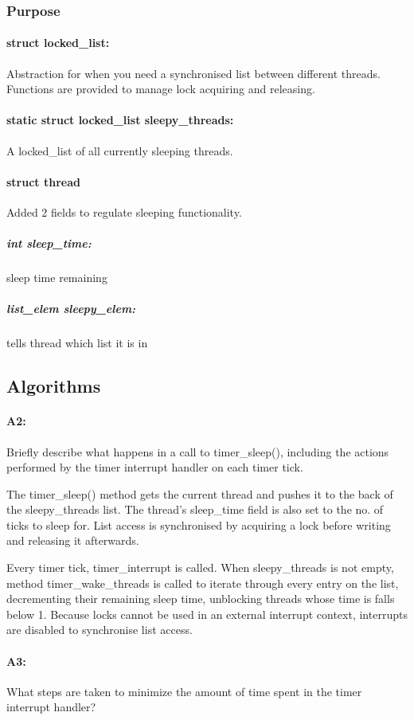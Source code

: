 \documentclass[11pt]{article}
\begin{document}
\subsubsection{Purpose}
\paragraph{struct locked\_list: }
Abstraction for when you need a synchronised list between different threads. Functions are provided to manage lock acquiring and releasing.

\paragraph{static struct locked\_list sleepy\_threads: }
A locked\_list of all currently sleeping threads.

\paragraph{struct thread}
  Added 2 fields to regulate sleeping functionality.

\subparagraph{int sleep\_time:} sleep time remaining
\subparagraph{list\_elem sleepy\_elem:} tells thread which list it is in

\subsection{Algorithms}
\paragraph{A2:} Briefly describe what happens in a call to timer\_sleep(), including the actions performed by the timer interrupt handler on each timer tick.

The timer\_sleep() method gets the current thread and pushes it to the back of the sleepy\_threads list. The thread's sleep\_time field is also set to the no. of ticks to sleep for. List access is synchronised by acquiring a lock before writing and releasing it afterwards.

Every timer tick, timer\_interrupt is called. When sleepy\_threads is not empty, method timer\_wake\_threads is called to iterate through every entry on the list, decrementing their remaining sleep time, unblocking threads whose time is falls below 1. Because locks cannot be used in an external interrupt context, interrupts are disabled to synchronise list access.

\paragraph{A3:} What steps are taken to minimize the amount of time spent in the timer interrupt handler?
\end{document}
